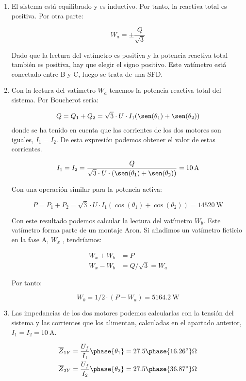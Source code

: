 \begin{enumerate}
\item El sistema está equilibrado y es inductivo. Por tanto, la reactiva total es positiva. Por otra parte:

  \[
    W_a = \pm \frac{Q}{\sqrt{3}}
  \]

  Dado que la lectura del vatímetro es positiva y la potencia reactiva total también es positiva, hay que elegir el signo positivo. Este vatímetro está conectado entre B y C, luego se trata de una SFD.
\item Con la lectura del vatímetro $W_a$ tenemos la potencia reactiva total del sistema. Por Boucherot sería:

  \[
    Q = Q_1 + Q_2 = \sqrt{3} \cdot U \cdot I_1 (\sen(\theta_1) + \sen(\theta_2))
  \]
  donde se ha tenido en cuenta que las corrientes de los dos motores son iguales, $I_1 = I_2$. De esta expresión podemos obtener el valor de estas corrientes.

  \[
    I_1 = I_2 = \frac{Q}{\sqrt{3} \cdot U \cdot (\sen(\theta_1) + \sen(\theta_2))} = \qty{10}{\ampere}
  \]

  Con una operación similar para la potencia activa:

  \[
    P = P_1 + P_2 = \sqrt{3} \cdot U \cdot I_1 (\cos(\theta_1) + \cos(\theta_2)) = \qty{14520}{\watt}
  \]

  Con este resultado podemos calcular la lectura del vatímetro $W_b$. Este vatímetro forma parte de un montaje Aron. Si añadimos un vatímetro ficticio en la fase A, $W_x$ , tendríamos:

  \begin{align*}
    W_x + W_b &= P\\
    W_x - W_b &= Q/\sqrt{3} = W_a
  \end{align*}

  Por tanto:

  \[
    W_b = 1/2 \cdot (P - W_a) = \qty{5164.2}{\watt}
  \]
  
\item Las impedancias de los dos motores podemos calcularlas con la tensión del sistema y las corrientes que los alimentan, calculadas en el apartado anterior, $I_1 = I_2 = \qty{10}{\ampere}$.

    \begin{align*}
      \overline{Z}_{1Y} &= \frac{U_f}{I_1}\phase{\theta_1} = 27.5\phase{\ang{16.26}}\unit{\ohm}\\
      \overline{Z}_{2Y} &= \frac{U_f}{I_2}\phase{\theta_2} = 27.5\phase{\ang{36.87}}\unit{\ohm}
  \end{align*}


\end{enumerate}
